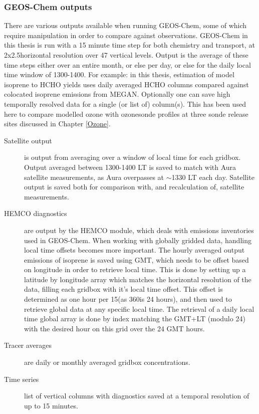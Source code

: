     \subsubsection{GEOS-Chem outputs}
      \label{Model:GC:simulation:outputs}
      There are various outputs available when running GEOS-Chem, some of which require manipulation in order to compare against observations.
      GEOS-Chem in this thesis is run with a 15 minute time step for both chemistry and transport, at 2x2.5\degr horizontal resolution over 47 vertical levels.
      Output is the average of these time steps either over an entire month, or else per day, or else for the daily local time window of 1300-1400.
      For example: in this thesis, estimation of model isoprene to HCHO yields uses daily averaged HCHO columns compared against colocated isoprene emissions from MEGAN.
      Optionally one can save high temporally resolved data for a single (or list of) column(s).
      This has been used here to compare modelled ozone with ozonesonde profiles at three sonde release sites discussed in Chapter \ref{Ozone}.
      
      \begin{description}
        \item[Satellite output]%
        is output from averaging over a window of local time for each gridbox. 
        Output averaged between 1300-1400 LT is saved to match with Aura satellite measurements, as Aura overpasses at $\sim$1330 LT each day.
        Satellite output is saved both for comparison with, and recalculation of, satellite measurements.
        \item[HEMCO diagnostics]%
        are output by the HEMCO module, which deals with emissions inventories used in GEOS-Chem.
        When working with globally gridded data, handling local time offsets becomes more important.
        The hourly averaged output emissions of isoprene is saved using GMT, which needs to be offset based on longitude in order to retrieve local time.
        This is done by setting up a latitude by longitude array which matches the horizontal resolution of the data, filling each gridbox with it's local time offset.
        This offset is determined as one hour per 15\degr (as 360\degr is 24 hours), and then used to retrieve global data at any specific local time.
        The retrieval of a daily local time global array is done by index matching the GMT+LT (modulo 24) with the desired hour on this grid over the 24 GMT hours.
        \item[Tracer averages]%
        are daily or monthly averaged gridbox concentrations. 
        \item[Time series]%
        list of vertical columns with diagnostics saved at a temporal resolution of up to 15 minutes.
        
        
      \end{description}
    

